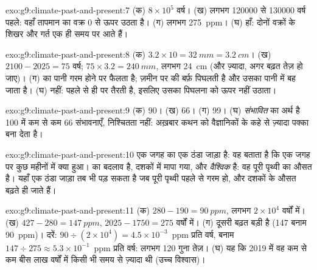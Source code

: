 \begin{solution}{exo:g9:climate-past-and-present:7}
(क) $8 \times 10^5$ वर्ष। (ख) लगभग \num{120000} से \num{130000} वर्ष
पहले: वहाँ तापमान का वक्र 0 से ऊपर उठता है। (ग) लगभग \qty{275}{ppm}।
(घ) हाँ: दोनों वक्रों के शिखर और गर्त एक ही समय पर आते हैं।
\end{solution}

\begin{solution}{exo:g9:climate-past-and-present:8}
(क) $3.2 \times 10 = \qty{32}{mm} = \qty{3.2}{cm}$। (ख) $2100 - 2025 =
75$ वर्ष; $75 \times 3.2 = \qty{240}{mm}$, लगभग \qty{24}{cm} (और
ज़्यादा, अगर बढ़त तेज़ हो जाए)। (ग)  का पानी गरम होने पर फैलता है; ज़मीन पर की
बर्फ़ पिघलती है और उसका पानी  में बह जाता है। (घ) नहीं:  पहले से ही
 पर तैरती है, इसलिए उसका पिघलना  को ऊपर नहीं उठाता।
\end{solution}

\begin{solution}{exo:g9:climate-past-and-present:9}
(क) 90। (ख) 66। (ग) 99। (घ) \emph{संभावित} का अर्थ है 100 में कम से कम 66
संभावनाएँ, निश्चितता नहीं: अख़बार कथन को वैज्ञानिकों के कहे से ज़्यादा पक्का बना
देता है।
\end{solution}

\begin{solution}{exo:g9:climate-past-and-present:10}
एक जगह का एक ठंडा जाड़ा \emph{} है: वह बताता है कि एक जगह पर कुछ महीनों में क्या
हुआ।  \emph{} का बदलाव है, दशकों में मापा गया, और \emph{वैश्विक}
है: वह पूरी पृथ्वी का औसत है। यहाँ एक ठंडा जाड़ा तब भी पड़ सकता है जब पूरी पृथ्वी पहले से
गरम हो, और दशकों के औसत बढ़ते ही
जाते
हैं।
\end{solution}

\begin{solution}{exo:g9:climate-past-and-present:11}
(क) $280 - 190 = \qty{90}{ppm}$, लगभग $2 \times 10^4$ वर्षों में। (ख) $427
- 280 = \qty{147}{ppm}$, $2025 - 1750 = 275$ वर्षों में। (ग) दूसरी
बढ़त बड़ी है (147 बनाम 90~ppm)। दरें: $90 \div (2 \times 10^4) =
4.5 \times 10^{-3}$~ppm प्रति वर्ष, बनाम $147 \div 275 \approx 5.3 \times
10^{-1}$~ppm प्रति वर्ष: लगभग 120 गुना तेज़। (घ) यह कि 2019 में वह
कम से कम बीस लाख वर्षों में किसी भी समय से ज़्यादा थी (उच्च विश्वास)।
\end{solution}

